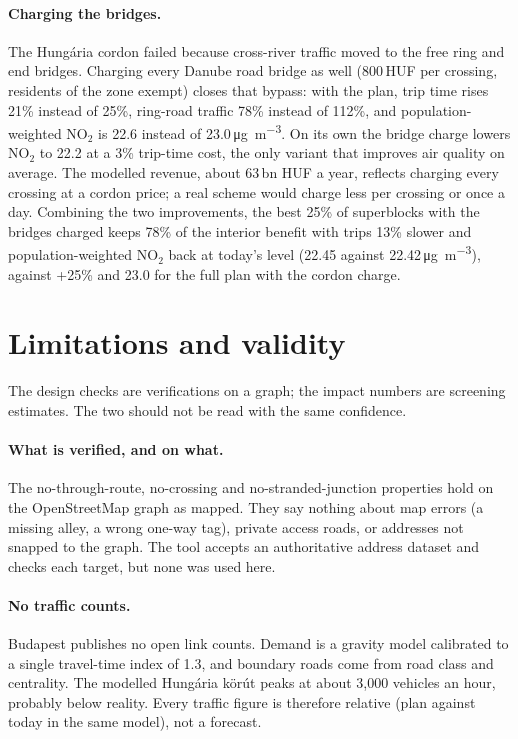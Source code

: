 \documentclass[11pt,a4paper]{article}
\begin{document}
\paragraph{Charging the bridges.} The Hungária cordon failed because cross-river traffic moved to the free ring and end bridges. Charging every Danube road bridge as well (800\,HUF per crossing, residents of the zone exempt) closes that bypass: with the plan, trip time rises 21\% instead of 25\%, ring-road traffic 78\% instead of 112\%, and population-weighted NO$_2$ is 22.6 instead of 23.0\,\si{\micro\gram\per\cubic\metre}. On its own the bridge charge lowers NO$_2$ to 22.2 at a 3\% trip-time cost, the only variant that improves air quality on average. The modelled revenue, about 63\,bn HUF a year, reflects charging every crossing at a cordon price; a real scheme would charge less per crossing or once a day. Combining the two improvements, the best 25\% of superblocks with the bridges charged keeps 78\% of the interior benefit with trips 13\% slower and population-weighted NO$_2$ back at today's level (22.45 against 22.42\,\si{\micro\gram\per\cubic\metre}), against +25\% and 23.0 for the full plan with the cordon charge.

\section{Limitations and validity}\label{sec:limits}

The design checks are verifications on a graph; the impact numbers are screening estimates. The two should not be read with the same confidence.

\paragraph{What is verified, and on what.} The no-through-route, no-crossing and no-stranded-junction properties hold on the OpenStreetMap graph as mapped. They say nothing about map errors (a missing alley, a wrong one-way tag), private access roads, or addresses not snapped to the graph. The tool accepts an authoritative address dataset and checks each target, but none was used here.

\paragraph{No traffic counts.} Budapest publishes no open link counts. Demand is a gravity model calibrated to a single travel-time index of 1.3, and boundary roads come from road class and centrality. The modelled Hungária körút peaks at about 3,000 vehicles an hour, probably below reality. Every traffic figure is therefore relative (plan against today in the same model), not a forecast.
\end{document}
